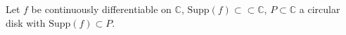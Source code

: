 Let $f$ be continuously differentiable on $\mathbb{C}$, $\text{Supp}(f) \subset \subset \mathbb{C}$, $P \subset \mathbb{C}$ a circular disk with $\text{Supp}(f) \subset P$.
